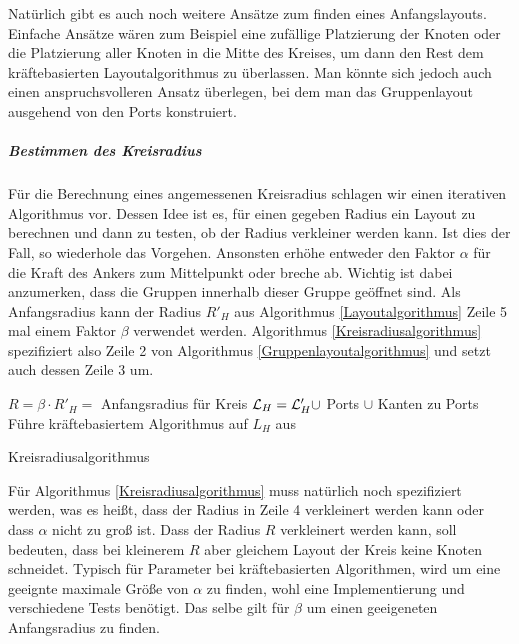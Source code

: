 Natürlich gibt es auch noch weitere Ansätze zum finden eines Anfangslayouts.
Einfache Ansätze wären zum Beispiel eine zufällige Platzierung der Knoten oder die Platzierung aller Knoten in die Mitte des Kreises, 
um dann den Rest dem kräftebasierten Layoutalgorithmus zu überlassen. 
Man könnte sich jedoch auch einen anspruchsvolleren Ansatz überlegen, bei dem man das Gruppenlayout ausgehend von den Ports konstruiert.


\subparagraph{Bestimmen des Kreisradius}

Für die Berechnung eines angemessenen Kreisradius schlagen wir einen iterativen Algorithmus vor. 
Dessen Idee ist es, für einen gegeben Radius ein Layout zu berechnen und dann zu testen, ob der Radius verkleiner werden kann. 
Ist dies der Fall, so wiederhole das Vorgehen. Ansonsten erhöhe entweder den Faktor $\alpha$ für die Kraft des Ankers zum Mittelpunkt oder breche ab. 
Wichtig ist dabei anzumerken, dass die Gruppen innerhalb dieser Gruppe geöffnet sind.
Als Anfangsradius kann der Radius $R'_H$ aus Algorithmus \ref{Layoutalgorithmus} Zeile 5 mal einem Faktor $\beta$ verwendet werden.
Algorithmus \ref{Kreisradiusalgorithmus} spezifiziert also Zeile 2 von Algorithmus  \ref{Gruppenlayoutalgorithmus} und setzt auch dessen Zeile 3 um.

\begin{algorithm}[H]
\label{Kreisradiusalgorithmus}
\SetAlgoLined
{}
$R = \beta \cdot R'_H = $ Anfangsradius für Kreis\;
$\mathcal{L}_H = \mathcal{L}'_H \cup$ Ports $\cup$  Kanten zu Ports\;
Führe kräftebasiertem Algorithmus auf  $L_H$ aus\;
\caption{Kreisradiusalgorithmus}
\end{algorithm}

Für Algorithmus \ref{Kreisradiusalgorithmus} muss natürlich noch spezifiziert werden, was es heißt, dass der Radius in Zeile 4 verkleinert werden kann
oder dass $\alpha$ nicht zu groß ist. 
Dass der Radius $R$ verkleinert werden kann, soll bedeuten, dass bei kleinerem $R$ aber gleichem Layout der Kreis keine Knoten schneidet. 
Typisch für Parameter bei kräftebasierten Algorithmen, wird um eine geeignte maximale Größe von $\alpha$ zu finden, wohl eine Implementierung und verschiedene Tests benötigt. 
Das selbe gilt für $\beta$ um einen geeigeneten Anfangsradius zu finden.

